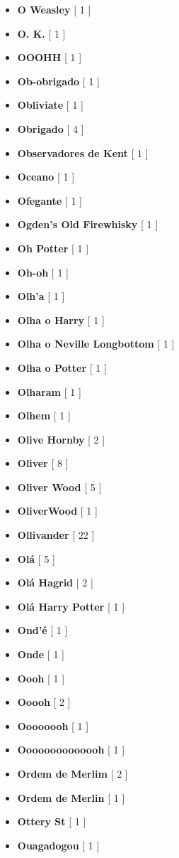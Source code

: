 \documentclass[a4paper]{article}
\begin{document}
{\begin{itemize}
	\item \textbf{O Weasley} [ 1 ]
	\item \textbf{O. K.} [ 1 ]
	\item \textbf{OOOHH} [ 1 ]
	\item \textbf{Ob-obrigado} [ 1 ]
	\item \textbf{Obliviate} [ 1 ]
	\item \textbf{Obrigado} [ 4 ]
	\item \textbf{Observadores de Kent} [ 1 ]
	\item \textbf{Oceano} [ 1 ]
	\item \textbf{Ofegante} [ 1 ]
	\item \textbf{Ogden's Old Firewhisky} [ 1 ]
	\item \textbf{Oh Potter} [ 1 ]
	\item \textbf{Oh-oh} [ 1 ]
	\item \textbf{Olh'a} [ 1 ]
	\item \textbf{Olha o Harry} [ 1 ]
	\item \textbf{Olha o Neville Longbottom} [ 1 ]
	\item \textbf{Olha o Potter} [ 1 ]
	\item \textbf{Olharam} [ 1 ]
	\item \textbf{Olhem} [ 1 ]
	\item \textbf{Olive Hornby} [ 2 ]
	\item \textbf{Oliver} [ 8 ]
	\item \textbf{Oliver Wood} [ 5 ]
	\item \textbf{OliverWood} [ 1 ]
	\item \textbf{Ollivander} [ 22 ]
	\item \textbf{Olá} [ 5 ]
	\item \textbf{Olá Hagrid} [ 2 ]
	\item \textbf{Olá Harry Potter} [ 1 ]
	\item \textbf{Ond'é} [ 1 ]
	\item \textbf{Onde} [ 1 ]
	\item \textbf{Oooh} [ 1 ]
	\item \textbf{Ooooh} [ 2 ]
	\item \textbf{Oooooooh} [ 1 ]
	\item \textbf{Oooooooooooooh} [ 1 ]
	\item \textbf{Ordem de Merlim} [ 2 ]
	\item \textbf{Ordem de Merlin} [ 1 ]
	\item \textbf{Ottery St} [ 1 ]
	\item \textbf{Ouagadogou} [ 1 ]

\end{itemize}}
\end{document}
